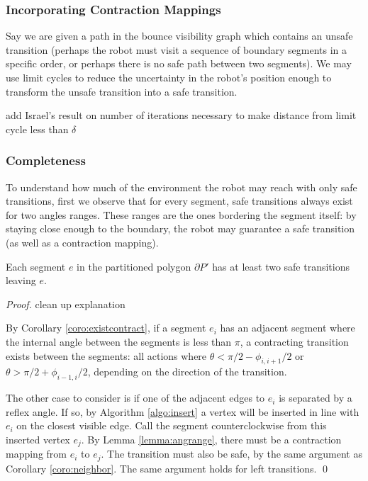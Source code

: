 \documentclass[]{styles/svproc}  %
\begin{document}
\subsubsection{Incorporating Contraction Mappings}

Say we are given a path in the bounce visibility graph which contains an unsafe
transition (perhaps the robot must visit a sequence of boundary segments in a
specific order, or perhaps there is no safe path between two segments). We may
use limit cycles to reduce the uncertainty in the robot's position enough to
transform the unsafe transition into a safe transition.

{\color{red} add Israel's result on number of iterations necessary to make distance from
limit cycle less than $\delta$}

\subsubsection{Completeness}

To understand how much of the environment the robot may reach with only safe
transitions, first we observe that for every segment, safe transitions always exist
for two angles ranges. These ranges are the ones bordering the segment itself:
by staying close enough to the boundary, the robot may guarantee a safe
transition (as well as a contraction mapping).

\begin{lemma}
Each segment $e$ in the partitioned polygon $\partial P'$ has at least two safe transitions
leaving $e$.
\end{lemma}

\begin{proof}

{\color{red} clean up explanation}

By Corollary \ref{coro:existcontract}, if a segment $e_i$ has an adjacent segment
where the internal angle between the segments is less than $\pi$, a contracting
transition exists between the segments: all actions where $\theta < \pi/2 -
\phi_{i,i+1}/2$ or $\theta > \pi/2 + \phi_{i-1,i}/2$, depending on the direction
of the transition.

The other case to consider is if one of the adjacent edges to $e_i$ is
separated by a reflex angle. If so, by Algorithm \ref{algo:insert} a vertex
will be inserted in line with $e_i$ on the closest visible edge. Call the
segment counterclockwise from this inserted vertex $e_j$. 
By Lemma
\ref{lemma:angrange}, there must be a contraction mapping from $e_i$ to $e_j$.
The transition must also be safe, by the same argument as Corollary
\ref{coro:neighbor}. The same argument holds for left transitions.
\qed
\end{proof}
\end{document}
